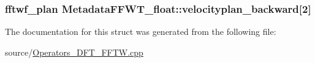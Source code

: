 \subsubsection[{velocityplan\+\_\+backward}]{\setlength{\rightskip}{0pt plus 5cm}fftwf\+\_\+plan Metadata\+F\+F\+W\+T\+\_\+float\+::velocityplan\+\_\+backward\mbox{[}2\mbox{]}}\label{struct_metadata_f_f_w_t__float_a9e2ff4e1a4bbf29bcfd38c908b615ed5}


The documentation for this struct was generated from the following file\+:\begin{DoxyCompactItemize}
\item 
source/\hyperlink{_operators___d_f_t___f_f_t_w_8cpp}{Operators\+\_\+\+D\+F\+T\+\_\+\+F\+F\+T\+W.\+cpp}\end{DoxyCompactItemize}
